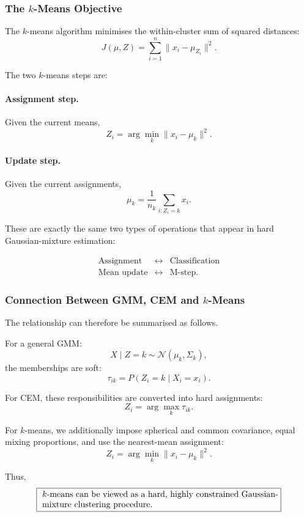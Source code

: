 \subsubsection{The $k$-Means Objective}

The $k$-means algorithm minimises the within-cluster sum of squared
distances:
\[
\boxed{
J(\mu,Z)
=
\sum_{i=1}^n
\|x_i-\mu_{Z_i}\|^2
}.
\]

The two $k$-means steps are:

\paragraph{Assignment step.}
Given the current means,
\[
Z_i
=
\arg\min_k
\|x_i-\mu_k\|^2.
\]

\paragraph{Update step.}
Given the current assignments,
\[
\mu_k
=
\frac{1}{n_k}
\sum_{i:Z_i=k}x_i.
\]

These are exactly the same two types of operations that appear in
hard Gaussian-mixture estimation:

\[
\boxed{
\begin{array}{ccc}
\text{Assignment} &\longleftrightarrow& \text{Classification}\\
\text{Mean update} &\longleftrightarrow& \text{M-step}.
\end{array}
}
\]

\subsubsection{Connection Between GMM, CEM and $k$-Means}

The relationship can therefore be summarised as follows.

For a general GMM:
\[
X\mid Z=k\sim\mathcal N(\mu_k,\Sigma_k),
\]
the memberships are soft:
\[
\tau_{ik}
=
P(Z_i=k\mid X_i=x_i).
\]

For CEM, these responsibilities are converted into hard assignments:
\[
Z_i
=
\arg\max_k\tau_{ik}.
\]

For $k$-means, we additionally impose spherical and common covariance,
equal mixing proportions, and use the nearest-mean assignment:
\[
Z_i
=
\arg\min_k
\|x_i-\mu_k\|^2.
\]

Thus,
\[
\fbox{
\parbox{0.8\textwidth}{
\(k\)-means can be viewed as a hard, highly constrained
Gaussian-mixture clustering procedure.
}}
\]

